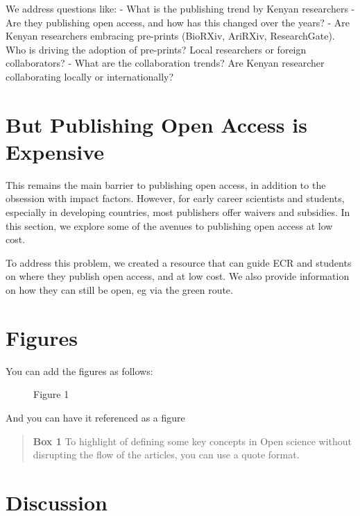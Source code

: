 We address questions like: - What is the publishing trend by Kenyan
researchers - Are they publishing open access, and how has this changed
over the years? - Are Kenyan researchers embracing pre-prints (BioRXiv,
AriRXiv, ResearchGate). Who is driving the adoption of pre-prints? Local
researchers or foreign collaborators? - What are the collaboration
trends? Are Kenyan researcher collaborating locally or internationally?

\section*{But Publishing Open Access is
Expensive}\label{but-publishing-open-access-is-expensive}

This remains the main barrier to publishing open access, in addition to
the obsession with impact factors. However, for early career scientists
and students, especially in developing countries, most publishers offer
waivers and subsidies. In this section, we explore some of the avenues
to publishing open access at low cost.

To address this problem, we created a resource that can guide ECR and
students on where they publish open access, and at low cost. We also
provide information on how they can still be open, eg via the green
route.

\section*{Figures}\label{figures}

You can add the figures as follows:

\begin{figure}[htbp]
\centering
\caption{Figure 1}
\end{figure}

And you can have it referenced as a figure

\begin{quote}
\textbf{Box 1} To highlight of defining some key concepts in Open
science without disrupting the flow of the articles, you can use a quote
format.
\end{quote}

\section*{Discussion}\label{discussion}

